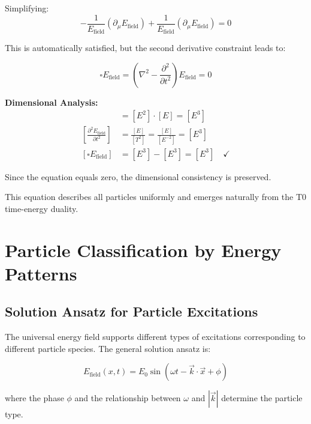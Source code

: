 \documentclass[12pt,a4paper]{report}
\begin{document}
	Simplifying:
	\begin{equation}
		-\frac{1}{E_{\text{field}}} (\partial_\mu E_{\text{field}}) + \frac{1}{E_{\text{field}}} (\partial_\mu E_{\text{field}}) = 0
	\end{equation}
	
	This is automatically satisfied, but the second derivative constraint leads to:
	
	\begin{equation}
		\boxed{\square E_{\text{field}} = \left(\nabla^2 - \frac{\partial^2}{\partial t^2}\right) E_{\text{field}} = 0}
		\label{eq:universal_wave_equation}
	\end{equation}
	
	\textbf{Dimensional Analysis:}
	\begin{align}
		[\nabla^2 E_{\text{field}}] &= [E^2] \cdot [E] = [E^3] \\
		\left[\frac{\partial^2 E_{\text{field}}}{\partial t^2}\right] &= \frac{[E]}{[T^2]} = \frac{[E]}{[E^{-2}]} = [E^3] \\
		[\square E_{\text{field}}] &= [E^3] - [E^3] = [E^3] \quad \checkmark
	\end{align}
	
	Since the equation equals zero, the dimensional consistency is preserved.
	
	This equation describes all particles uniformly and emerges naturally from the T0 time-energy duality.
	
	\section{Particle Classification by Energy Patterns}
	\label{sec:particle_classification}
	
	\subsection{Solution Ansatz for Particle Excitations}
	\label{subsec:solution_ansatz}
	
	The universal energy field supports different types of excitations corresponding to different particle species. The general solution ansatz is:
	
	\begin{equation}
		E_{\text{field}}(x,t) = E_0 \sin(\omega t - \vec{k} \cdot \vec{x} + \phi)
	\end{equation}
	
	where the phase $\phi$ and the relationship between $\omega$ and $|\vec{k}|$ determine the particle type.
	
\end{document}
